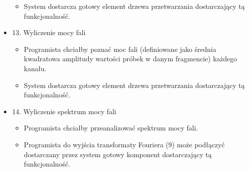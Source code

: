 \begin{itemize}
\begin{itemize}
		\item System dostarcza gotowy element drzewa przetwarzania dostarczający tą funkcjonalność.
	\end{itemize}
	\item 13. Wyliczenie mocy fali
	\begin{itemize}
		\item Programista chciałby poznać moc fali (definiowane jako średnia kwadratowa amplitudy wartości próbek w danym fragmencie) każdego kanału.
		\item System dostarcza gotowy element drzewa przetwarzania dostarczający tą funkcjonalność.
	\end{itemize}
	\item 14. Wyliczenie spektrum mocy fali
	\begin{itemize}
		\item Programista chciałby przeanalizować spektrum mocy fali.
		\item Programista do wyjścia transformaty Fouriera (9) może podłączyć dostarczany przez system gotowy komponent dostarczający tą funkcjonalność.
	\end{itemize}
\end{itemize}



